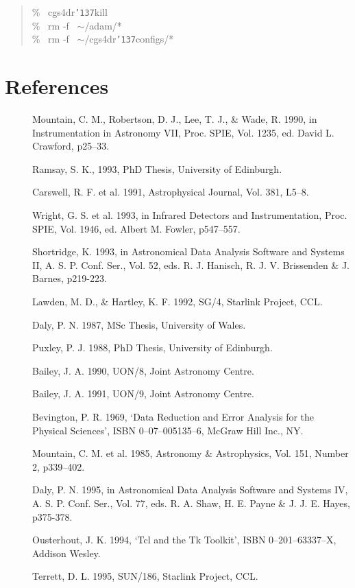 \documentclass[a4paper]{book}
\newcommand{\stardocinitials}  {SUN}
\newcommand{\stardocnumber}    {27.5}
\newcommand{\stardocname}{\stardocinitials /\stardocnumber}
\renewcommand{\_}{{\tt\char'137}}
\begin{document}
\begin{quote}
  \% \ cgs4dr\_kill \\
  \% \ rm -f \ $\sim$/adam/* \\
  \% \ rm -f \ $\sim$/cgs4dr\_configs/*
\end{quote}

\chapter*{References}
\markboth{References}{\stardocname}

\begin{description}
\item[] Mountain, C. M., Robertson, D. J., Lee, T. J., \& Wade, R. 1990,
      in Instrumentation in Astronomy VII, Proc. SPIE, Vol. 1235, ed. David L. Crawford, p25--33.
\item[] Ramsay, S. K., 1993, PhD Thesis, University of Edinburgh.
\item[] Carswell, R. F. et al. 1991, Astrophysical Journal, Vol. 381, L5--8.
\item[] Wright, G. S. et al. 1993, in Infrared Detectors and Instrumentation, Proc. SPIE,
      Vol. 1946, ed. Albert M. Fowler, p547--557.
\item[] Shortridge, K. 1993, in  Astronomical Data Analysis Software
      and Systems II, A. S. P. Conf. Ser., Vol. 52, eds. R. J. Hanisch,
      R. J. V. Brissenden \& J. Barnes, p219-223.
\item[] Lawden, M. D., \& Hartley, K. F. 1992, SG/4, Starlink Project, CCL.
\item[] Daly, P. N. 1987, MSc Thesis, University of Wales.
\item[] Puxley, P. J. 1988, PhD Thesis, University of Edinburgh.
\item[] Bailey, J. A. 1990, UON/8, Joint Astronomy Centre.
\item[] Bailey, J. A. 1991, UON/9, Joint Astronomy Centre.
\item[] Bevington, P. R. 1969, `Data Reduction and Error Analysis for the Physical Sciences',
      ISBN 0--07--005135--6, McGraw Hill Inc., NY.
\item[] Mountain, C. M. et al. 1985, Astronomy \& Astrophysics, Vol. 151, Number 2, p339--402.
\item[] Daly, P. N. 1995, in Astronomical Data Analysis Software and Systems IV,
      A. S. P. Conf. Ser., Vol. 77, eds. R. A. Shaw, H. E. Payne \& J. J. E. Hayes, p375-378.
\item[] Ousterhout, J. K. 1994, `Tcl and the Tk Toolkit', ISBN 0--201--63337--X, Addison Wesley.
\item[] Terrett, D. L. 1995, SUN/186, Starlink Project, CCL.
\end{description}
\end{document}
